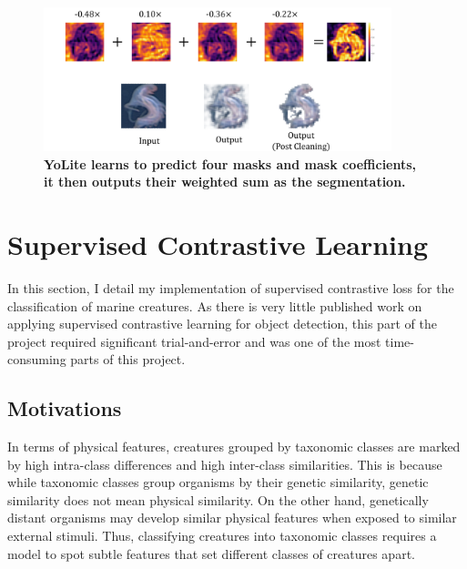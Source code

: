 \documentclass[12pt,a4paper,twoside,openany]{report}
\begin{document}
\begin{figure}[H]
    \centering
    \includegraphics[width=0.9\textwidth]{figs/implementation/yolact/yolite_deomonstration.png}
    \caption{\textbf{YoLite learns to predict four masks and mask coefficients, it then outputs their weighted sum as the segmentation. }}
    \label{fig:yolact_demo}
\end{figure}

\section{Supervised Contrastive Learning}
In this section, I detail my implementation of supervised contrastive loss \cite{khosla_supervised_2021} for the classification of marine creatures. As there is very little published work on applying supervised contrastive learning for object detection, this part of the project required significant trial-and-error and was one of the most time-consuming parts of this project.

\subsection{Motivations}
In terms of physical features, creatures grouped by taxonomic classes are marked by high intra-class differences and high inter-class similarities. This is because while taxonomic classes group organisms by their genetic similarity, genetic similarity does not mean physical similarity. On the other hand, genetically distant organisms may develop similar physical features when exposed to similar external stimuli. Thus, classifying creatures into taxonomic classes requires a model to spot subtle features that set different classes of creatures apart. 
\end{document}
